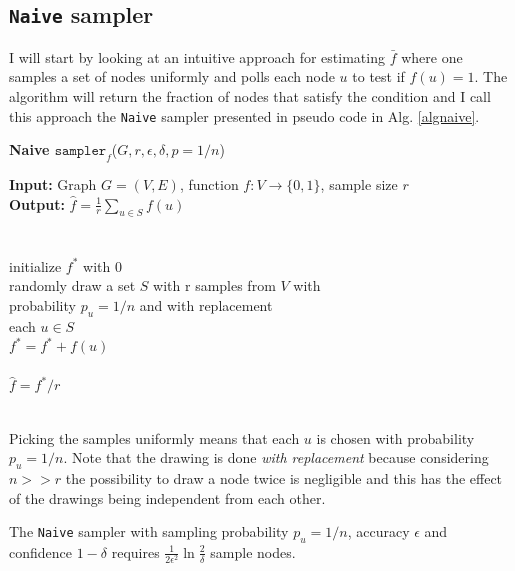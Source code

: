\subsection{\texttt{Naive} sampler}
I will start by looking at an intuitive approach for estimating $\bar{f}$ where one samples a set of nodes uniformly and polls each node $u$ to test if $f(u)=1$.
The algorithm will return the fraction of nodes that satisfy the condition and I call this approach the \texttt{Naive} sampler presented in pseudo code in Alg. \ref{algnaive}.

\begin{algorithm*}[!htb]
  \caption{\small {\bf Naive $\texttt{sampler}_f$}($G, r, \epsilon, \delta, p = 1/n$)}
  \begin{code}
  {\bf Input:} Graph $G=(V,E)$, function $f : V \rightarrow \{0,1\}$, sample size $r$ \\
  {\bf Output:} $\hat{f}=\frac{1}{r}\sum\nolimits_{u\in S} f(u)$\\
  \\
  \uln \>\ubegin\\
  \uln \>\>initialize $f^*$ with 0 \\
  \uln \>\>randomly draw a set $S$ with r samples from $V$ with\\
  \>\>\>\>probability $p_u = 1/n$ and with replacement\\
  \uln \>\>\ufor each $u \in S$ \udo\\
  \uln \>\>\>$f^* = f^* + f(u)$ \\
  \uln \>\>\uend\\
  \uln \>\ureturn $\hat{f} = f^*/r$ \\
  \uln \>\uend\\ 
  \end{code}
  \label{algnaive}
\end{algorithm*}
Picking the samples uniformly means that each $u$ is chosen with probability $p_u = 1/n$. Note that the drawing is done \textit{with replacement} because considering $n >> r$ the possibility to draw a node twice is negligible and this has the effect of the drawings being independent from each other.
\begin{theorem}
\label{samplingtheorem}
  The \texttt{Naive} sampler with sampling probability $p_u = 1/n$, accuracy $\epsilon$ and confidence $1-\delta$ requires $\frac{1}{2\epsilon^2}\ln{\frac{2}{\delta}}$ sample nodes.
\end{theorem}
